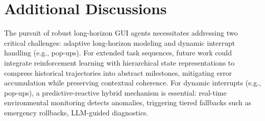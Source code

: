 \documentclass{article} %
\begin{document}
\section{Additional Discussions}
\label{sec:discussion}

The pursuit of robust long-horizon GUI agents necessitates addressing two critical challenges: adaptive long-horizon modeling and dynamic interrupt handling (e.g., pop-ups). For extended task sequences, future work could integrate reinforcement learning with hierarchical state representations to compress historical trajectories into abstract milestones, mitigating error accumulation while preserving contextual coherence. For dynamic interrupts (e.g., pop-ups), a predictive-reactive hybrid mechanism is essential: real-time environmental monitoring detects anomalies, triggering tiered fallbacks such as emergency rollbacks, LLM-guided diagnostics.
\end{document}

